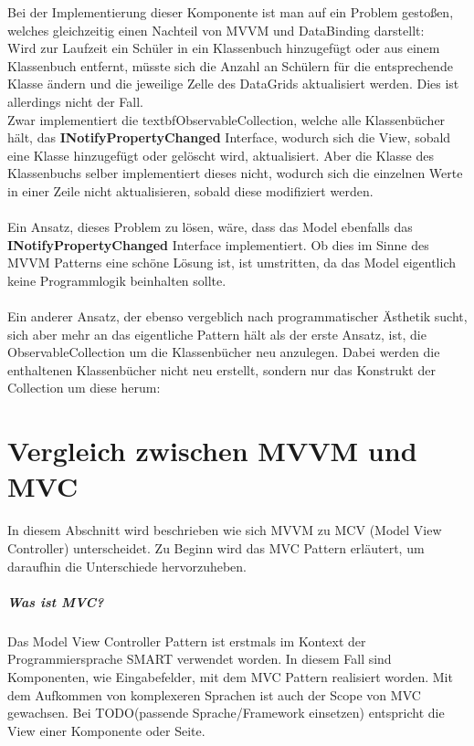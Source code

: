 \documentclass[titlepage=false,12pt]{scrreprt}
\begin{document}
\noindent
Bei der Implementierung dieser Komponente ist man auf ein Problem gestoßen, welches gleichzeitig einen Nachteil von MVVM und DataBinding darstellt:\\
Wird zur Laufzeit ein Schüler in ein Klassenbuch hinzugefügt oder aus einem Klassenbuch entfernt, müsste sich die Anzahl an Schülern für die entsprechende Klasse
ändern und die jeweilige Zelle des DataGrids aktualisiert werden. Dies ist allerdings nicht der Fall.\\
Zwar implementiert die textbf{ObservableCollection}, welche alle Klassenbücher hält, das \textbf{INotifyPropertyChanged} Interface, wodurch sich die View, sobald
eine Klasse hinzugefügt oder gelöscht wird, aktualisiert. Aber die Klasse des Klassenbuchs selber implementiert dieses nicht, wodurch sich die einzelnen 
Werte in einer Zeile nicht aktualisieren, sobald diese modifiziert werden.\\
\\
Ein Ansatz, dieses Problem zu lösen, wäre, dass das Model ebenfalls das \textbf{INotifyPropertyChanged} Interface implementiert. Ob dies im Sinne des MVVM
Patterns eine schöne Lösung ist, ist umstritten, da das Model eigentlich keine Programmlogik beinhalten sollte.\\
\\
Ein anderer Ansatz, der ebenso vergeblich nach programmatischer Ästhetik sucht, sich aber mehr an das eigentliche Pattern hält als der erste Ansatz, 
ist, die ObservableCollection um die Klassenbücher neu anzulegen. Dabei werden die enthaltenen Klassenbücher nicht neu erstellt, sondern nur das Konstrukt
der Collection um diese herum:



\chapter{Vergleich zwischen MVVM und MVC}

In diesem Abschnitt wird beschrieben wie sich MVVM zu MCV (Model View Controller) unterscheidet. 
Zu Beginn wird das MVC Pattern erläutert, um daraufhin die Unterschiede hervorzuheben. 

\paragraph{Was ist MVC?}

Das Model View Controller Pattern ist erstmals im Kontext der Programmiersprache SMART verwendet 
worden. In diesem Fall sind Komponenten, wie Eingabefelder, mit dem MVC Pattern realisiert worden.
Mit dem Aufkommen von komplexeren Sprachen ist auch der Scope von MVC gewachsen. Bei TODO(passende Sprache/Framework einsetzen)
entspricht die View einer Komponente oder Seite.
\end{document}
